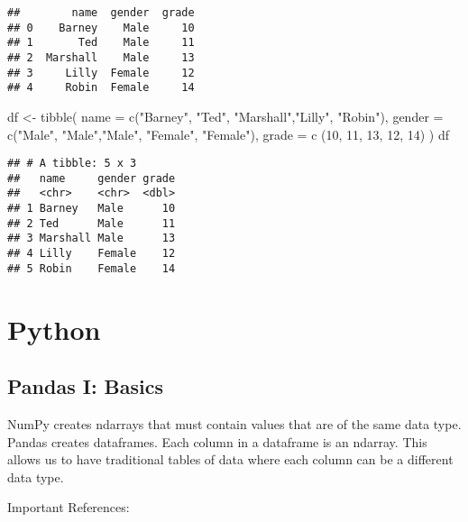 \documentclass[
]{book}
\newenvironment{Shaded}{\begin{snugshade}}{\end{snugshade}}
\newcommand{\AttributeTok}[1]{\textcolor[rgb]{0.77,0.63,0.00}{#1}}
\newcommand{\DecValTok}[1]{\textcolor[rgb]{0.00,0.00,0.81}{#1}}
\newcommand{\FunctionTok}[1]{\textcolor[rgb]{0.00,0.00,0.00}{#1}}
\newcommand{\NormalTok}[1]{#1}
\newcommand{\OtherTok}[1]{\textcolor[rgb]{0.56,0.35,0.01}{#1}}
\newcommand{\StringTok}[1]{\textcolor[rgb]{0.31,0.60,0.02}{#1}}
\begin{document}
\begin{verbatim}
##        name  gender  grade
## 0    Barney    Male     10
## 1       Ted    Male     11
## 2  Marshall    Male     13
## 3     Lilly  Female     12
## 4     Robin  Female     14
\end{verbatim}

\begin{Shaded}
\begin{Highlighting}[]
\NormalTok{df }\OtherTok{\textless{}{-}} \FunctionTok{tibble}\NormalTok{(}
  \AttributeTok{name =} \FunctionTok{c}\NormalTok{(}\StringTok{"Barney"}\NormalTok{, }\StringTok{"Ted"}\NormalTok{,}
           \StringTok{"Marshall"}\NormalTok{,}\StringTok{"Lilly"}\NormalTok{,}
           \StringTok{"Robin"}\NormalTok{),}
  \AttributeTok{gender =} \FunctionTok{c}\NormalTok{(}\StringTok{"Male"}\NormalTok{, }\StringTok{"Male"}\NormalTok{,}\StringTok{"Male"}\NormalTok{,}
             \StringTok{"Female"}\NormalTok{, }\StringTok{"Female"}\NormalTok{),}
  \AttributeTok{grade =} \FunctionTok{c}\NormalTok{ (}\DecValTok{10}\NormalTok{, }\DecValTok{11}\NormalTok{, }\DecValTok{13}\NormalTok{, }\DecValTok{12}\NormalTok{, }\DecValTok{14}\NormalTok{)}
\NormalTok{)}
\NormalTok{df}
\end{Highlighting}
\end{Shaded}

\begin{verbatim}
## # A tibble: 5 x 3
##   name     gender grade
##   <chr>    <chr>  <dbl>
## 1 Barney   Male      10
## 2 Ted      Male      11
## 3 Marshall Male      13
## 4 Lilly    Female    12
## 5 Robin    Female    14
\end{verbatim}

\hypertarget{python}{%
\chapter{Python}\label{python}}

\hypertarget{pandas-i-basics}{%
\section{Pandas I: Basics}\label{pandas-i-basics}}

NumPy creates ndarrays that must contain values that are of the same data type.
Pandas creates dataframes. Each column in a dataframe is an ndarray. This allows us to have
traditional tables of data where each column can be a different data type.

Important References:
\end{document}
